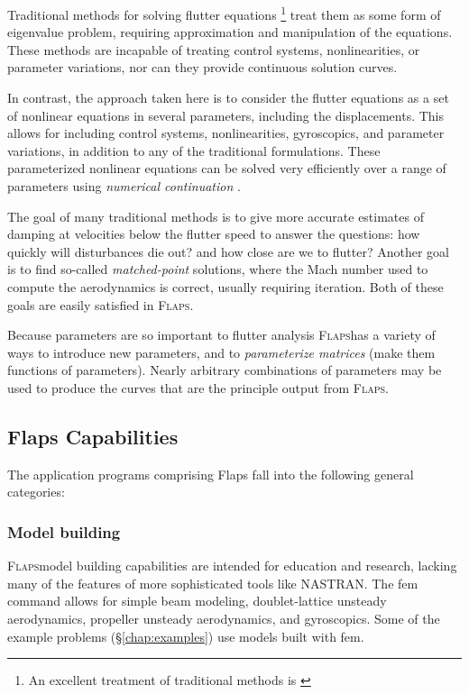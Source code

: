 \documentclass[11pt,openany,twoside]{book}
\numberwithin{equation}{section}		%
\newcommand{\Cmd}[1]{{\sf #1}}
\newcommand{\Newterm}[1]{{\em #1}}	%
\newcommand{\Flaps}{\textsc{Flaps\:}}
\newcommand{\Nastran}{{\footnotesize{NASTRAN\:}}}
\newcommand{\Sectref}[1]{\S\ref{#1}}
\begin{document}
Traditional methods for solving flutter equations
\footnote{An excellent treatment of traditional methods is \cite{demasi2024introduction}}
treat them as some form of eigenvalue problem, requiring approximation and
manipulation of the equations. These methods are incapable of treating
control systems, nonlinearities, or parameter variations, nor can they
provide continuous solution curves.

In contrast, the approach taken here is to consider the flutter equations as a
set of nonlinear equations in several parameters, including the displacements.
This allows for including control systems, nonlinearities, gyroscopics,
and parameter variations, in addition to any of the traditional
formulations.
These parameterized nonlinear equations can be solved very efficiently
over a range of parameters using \Newterm{numerical continuation}
\cite{allgower1990numerical}.

The goal of many traditional methods is to give more accurate estimates
of damping at velocities below the flutter speed to answer the questions:
how quickly will disturbances die out? and how close are we to flutter?
Another goal is to find so-called \emph{matched-point}
solutions, where the Mach number used to compute the aerodynamics is correct,
usually requiring iteration. Both of these goals are easily satisfied in \Flaps.

Because parameters are so important to flutter analysis \Flaps has
a variety of ways to introduce new parameters, and to
\Newterm{parameterize matrices} (make them functions of parameters).
Nearly arbitrary combinations of parameters may be used to produce
the curves that are the principle output from \Flaps.


\subsection{Flaps Capabilities}
The application programs comprising Flaps fall into the following
general categories:

\subsubsection{Model building}
\Flaps model building capabilities are intended for education
and research, lacking many of the features of more sophisticated
tools like \Nastran.
The \Cmd{fem} command allows for simple beam modeling,
doublet-lattice unsteady aerodynamics, propeller unsteady
aerodynamics, and gyroscopics. Some of the example problems (\Sectref{chap:examples})
use models built with \Cmd{fem}.
\end{document}
